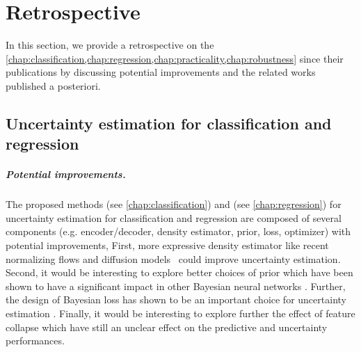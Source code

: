 \chapter{Retrospective}
\label{chap:retrospective_1}


In this section, we provide a retrospective on the \cref{chap:classification,chap:regression,chap:practicality,chap:robustness} since their publications by discussing potential improvements and the related works published a posteriori.

\section{Uncertainty estimation for classification and regression} 

\paragraph{Potential improvements.} The proposed methods \PostNetacro{} (see \cref{chap:classification}) and \NatPNacro{} (see \cref{chap:regression}) for uncertainty estimation for classification and regression are composed of several components (e.g. encoder/decoder, density estimator, prior, loss, optimizer) with potential improvements, First, more expressive density estimator like recent normalizing flows \cite{nf-review} and diffusion models \cite{variationaldiffussion2022kingma} could improve uncertainty estimation. Second, it would be interesting to explore better choices of prior which have been shown to have a significant impact in other Bayesian neural networks \cite{bayesposterior2020wenzel, coldaleatoric2020adlam}. Further, the design of Bayesian loss has shown to be an important choice for uncertainty estimation \cite{bengs2022pitfalls}. Finally, it would be interesting to explore further the effect of feature collapse \cite{due} which have still an unclear effect on the predictive and uncertainty performances.

